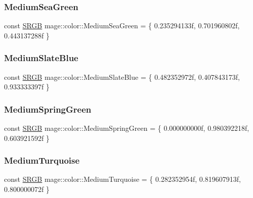 \subsubsection{\texorpdfstring{Medium\+Sea\+Green}{MediumSeaGreen}}
{\footnotesize\ttfamily const \hyperlink{structmage_1_1_s_r_g_b}{S\+R\+GB} mage\+::color\+::\+Medium\+Sea\+Green = \{ 0.\+235294133f, 0.\+701960802f, 0.\+443137288f \}}

\hypertarget{namespacemage_1_1color_a3ad1f8f0b3443c934ace4e42485b5905}{}\label{namespacemage_1_1color_a3ad1f8f0b3443c934ace4e42485b5905} 
\subsubsection{\texorpdfstring{Medium\+Slate\+Blue}{MediumSlateBlue}}
{\footnotesize\ttfamily const \hyperlink{structmage_1_1_s_r_g_b}{S\+R\+GB} mage\+::color\+::\+Medium\+Slate\+Blue = \{ 0.\+482352972f, 0.\+407843173f, 0.\+933333397f \}}

\hypertarget{namespacemage_1_1color_a3c9aafece772659e6401c317487c1135}{}\label{namespacemage_1_1color_a3c9aafece772659e6401c317487c1135} 
\subsubsection{\texorpdfstring{Medium\+Spring\+Green}{MediumSpringGreen}}
{\footnotesize\ttfamily const \hyperlink{structmage_1_1_s_r_g_b}{S\+R\+GB} mage\+::color\+::\+Medium\+Spring\+Green = \{ 0.\+000000000f, 0.\+980392218f, 0.\+603921592f \}}

\hypertarget{namespacemage_1_1color_aff861d171c3720c479662666c6bdf797}{}\label{namespacemage_1_1color_aff861d171c3720c479662666c6bdf797} 
\subsubsection{\texorpdfstring{Medium\+Turquoise}{MediumTurquoise}}
{\footnotesize\ttfamily const \hyperlink{structmage_1_1_s_r_g_b}{S\+R\+GB} mage\+::color\+::\+Medium\+Turquoise = \{ 0.\+282352954f, 0.\+819607913f, 0.\+800000072f \}}

